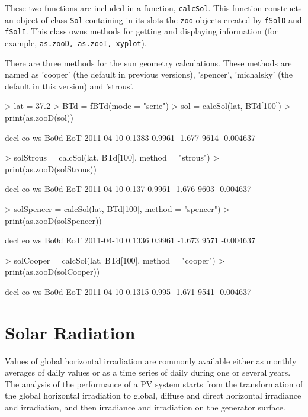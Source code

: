 \documentclass[oldfontcommands,a4paper]{memoir}
\renewenvironment{Schunk}{\vspace{\topsep}}{\vspace{\topsep}}
\begin{document}
These two functions are included in a function,  \texttt{calcSol}. 
This function constructs an object of class  \texttt{Sol} containing in its slots 
the \texttt{zoo} objects created by \texttt{fSolD} and \texttt{fSolI}. 
This class owns methods for getting and displaying information (for example, \texttt{as.zooD, as.zooI, xyplot}).

There are three methods for the sun geometry calculations. These
methods are named as 'cooper' (the default in previous versions),
'spencer', 'michalsky' (the default in this version) and 'strous'. 
\begin{Schunk}
\begin{Sinput}
> lat = 37.2
> BTd = fBTd(mode = "serie")
> sol = calcSol(lat, BTd[100])
> print(as.zooD(sol))
\end{Sinput}
\begin{Soutput}
             decl     eo     ws Bo0d       EoT
2011-04-10 0.1383 0.9961 -1.677 9614 -0.004637
\end{Soutput}
\begin{Sinput}
> solStrous = calcSol(lat, BTd[100], method = "strous")
> print(as.zooD(solStrous))
\end{Sinput}
\begin{Soutput}
            decl     eo     ws Bo0d       EoT
2011-04-10 0.137 0.9961 -1.676 9603 -0.004637
\end{Soutput}
\begin{Sinput}
> solSpencer = calcSol(lat, BTd[100], method = "spencer")
> print(as.zooD(solSpencer))
\end{Sinput}
\begin{Soutput}
             decl     eo     ws Bo0d       EoT
2011-04-10 0.1336 0.9961 -1.673 9571 -0.004637
\end{Soutput}
\begin{Sinput}
> solCooper = calcSol(lat, BTd[100], method = "cooper")
> print(as.zooD(solCooper))
\end{Sinput}
\begin{Soutput}
             decl    eo     ws Bo0d       EoT
2011-04-10 0.1315 0.995 -1.671 9541 -0.004637
\end{Soutput}
\end{Schunk}



\chapter{Solar Radiation}

Values of global horizontal irradiation are commonly available either
as monthly averages of daily values or as a time series of daily
during one or several years.  The analysis of the performance of a PV
system starts from the transformation of the global horizontal
irradiation to global, diffuse and direct horizontal irradiance and
irradiation, and then irradiance and irradiation on the generator
surface.
\end{document}
